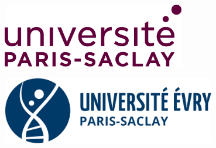 \pagestyle{empty} 

\begin{minipage}{.47\textwidth}
\centering
\begin{flushleft}
\includegraphics[width=0.6\textwidth]{./LOGOS/logo_paris_saclay}
\end{flushleft}
\end{minipage}
\begin{minipage}{.47\textwidth}
\centering
\begin{flushright}
\vspace*{0.45cm}\includegraphics[width=0.7\textwidth]{./LOGOS/logo_evry_paris_saclay}
\end{flushright}
\end{minipage}~\\[1.5cm]

\begin{center}
\end{center}

\begin{center}
  \Large
  \textbf{\Matiere}\\ %
  \HRule \\[0.4cm]
  \begin{center}
    \huge
    \textbf{\TP}\\ %
  \end{center}
  \HRule \\[1.5cm]
  
%  
 
\end{center}

